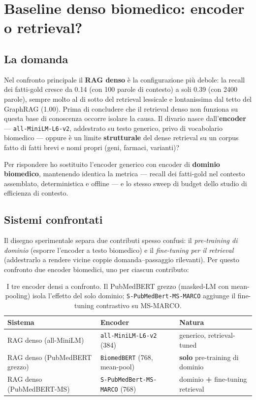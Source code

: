 \documentclass[11pt,a4paper]{report}
\begin{document}
\chapter{Baseline denso biomedico: encoder o retrieval?}
\label{ch:baseline-denso-biomedico}

\section{La domanda}

Nel confronto principale il \textbf{RAG denso} è la configurazione più
debole: la recall dei fatti-gold cresce da \num{0,14} (con \num{100} parole di
contesto) a soli \num{0,39} (con \num{2400} parole), sempre molto al di sotto
del retrieval lessicale e lontanissima dal tetto del GraphRAG (\num{1,00}).
Prima di concludere che \guillemotleft{}il retrieval denso non funziona su questa base di
conoscenza\guillemotright{} occorre isolare la causa. Il divario nasce dall'\textbf{encoder}
--- \texttt{all-MiniLM-L6-v2}, addestrato su testo generico, privo di
vocabolario biomedico --- oppure è un limite \textbf{strutturale} del dense
retrieval su un corpus fatto di fatti brevi e nomi propri (geni, farmaci,
varianti)?

Per rispondere ho sostituito l'encoder generico con encoder di
\textbf{dominio biomedico}, mantenendo identica la metrica --- recall dei
fatti-gold nel contesto assemblato, deterministica e offline --- e lo stesso
sweep di budget dello studio di efficienza di contesto.

\section{Sistemi confrontati}

Il disegno sperimentale separa due contributi spesso confusi: il
\emph{pre-training di dominio} (esporre l'encoder a testo biomedico) e il
\emph{fine-tuning per il retrieval} (addestrarlo a rendere vicine coppie
domanda--passaggio rilevanti). Per questo confronto due encoder biomedici, uno
per ciascun contributo:

\begin{table}[H]
\centering
\begin{tabularx}{\textwidth}{@{}llX@{}}
\toprule
\textbf{Sistema} & \textbf{Encoder} & \textbf{Natura} \\
\midrule
RAG denso (all-MiniLM) & \texttt{all-MiniLM-L6-v2} (384) & generico, retrieval-tuned \\
RAG denso (PubMedBERT grezzo) & \texttt{BiomedBERT} (768, mean-pool) & \textbf{solo} pre-training di dominio \\
RAG denso (PubMedBERT-MS) & \texttt{S-PubMedBert-MS-MARCO} (768) & dominio \textbf{+} fine-tuning retrieval \\
\bottomrule
\end{tabularx}
\caption{I tre encoder densi a confronto. Il PubMedBERT grezzo (masked-LM con
mean-pooling) isola l'effetto del solo dominio; \texttt{S-PubMedBert-MS-MARCO}
aggiunge il fine-tuning contrastivo su MS-MARCO.}
\end{table}
\end{document}
